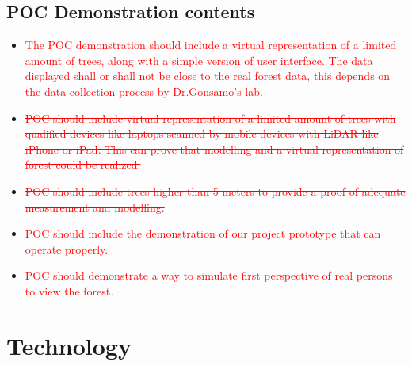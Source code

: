 \documentclass{article}
\begin{document}
\subsection{POC Demonstration contents}
\begin{itemize}
    \item \textcolor{red}{The POC demonstration should include a virtual representation of a limited
    amount of trees, along with a simple version of user interface. The data displayed shall or shall not
    be close to the real forest data, this depends on the data collection process by Dr.Gonsamo's lab. }

    \item \textcolor{red}{\sout{POC should include virtual representation of a limited amount
    of trees with qualified devices like laptops scanned by mobile devices with LiDAR like iPhone or iPad.
    This can prove that modelling and a virtual representation of forest could be realized.}}
    
    \item \textcolor{red}{\sout{POC should include trees higher than 5 meters to provide a proof of adequate measurement and modelling.}} 
    
    \item \textcolor{red}{POC should include the demonstration of our project prototype that can operate
    properly.}
    
    \item \textcolor{red}{POC should demonstrate a way to simulate first perspective of real persons to
    view the forest.}
\end{itemize}

\section{Technology}
\end{document}

